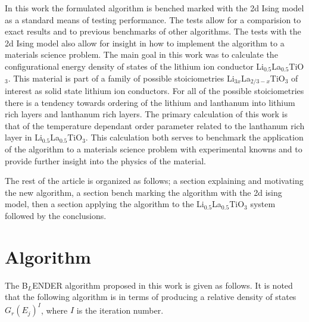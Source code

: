 \documentclass[aps,pre,reprint,superscriptaddress,showkeys]{revtex4-1}
\begin{document}
   In this work the formulated algorithm is benched marked with the 2d Ising model as a standard means of testing  performance.  The tests allow for a comparision to exact results and to previous benchmarks of other algorithms. The tests with the 2d Ising model also allow for insight in how to implement the algorithm to a materials science problem. The main goal in this work  was to calculate the configurational energy density of states of the lithium ion conductor Li$_{0.5}$La$_{0.5}$TiO$_3$.  This material is part of a family of possible stoiciometries Li$_{3x}$La$_{2/3 -x}$TiO$_3$ of interest as solid state lithium ion conductors\cite{domainboundaries,P4mmmstrucuture,imaginary_phonons,GENG2009555,peculiarities,LLTOreview,Li_La_ordering_computational}. For all of the possible stoiciometries there is a tendency towards ordering of the lithium and lanthanum into lithium rich layers and lanthanum rich layers.  The primary calculation of this work is that of the temperature dependant order parameter related to the lanthanum rich layer in Li$_{0.5}$La$_{0.5}$TiO$_3$. This calculation both serves to benchmark the application of the algorithm to a materials science problem with experimental knowns and to provide further insight into the physics of the material. 
   
   The rest of the article is organized as follows; a section explaining and motivating the new algorithm, a section bench marking the algorithm with the 2d ising model, then a section applying the algorithm to the Li$_{0.5}$La$_{0.5}$TiO$_3$ system followed by the conclusions. 

\section{Algorithm}
   
The B$_{L}$ENDER algorithm proposed in this work  is given as follows. It is noted that the following algorithm is in terms of producing a relative density of states $G_{r}(E_j)^I$, where $I$ is the iteration number. 
\end{document}
